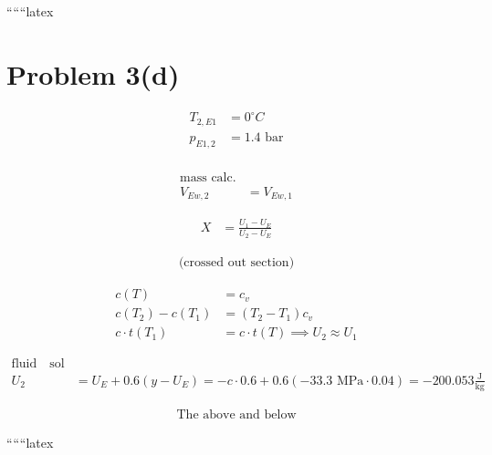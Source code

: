 ``````latex


\section*{Problem 3(d)}

\begin{align*}
T_{2, E1} &= 0^\circ C \\
p_{E1, 2} &= 1.4 \text{ bar} \\
\end{align*}

\begin{align*}
\text{mass calc.} \\
V_{Ew, 2} &= V_{Ew, 1}
\end{align*}

\begin{align*}
X &= \frac{U_1 - U_E}{U_2 - U_E}
\end{align*}

\begin{align*}
\text{(crossed out section)}
\end{align*}

\begin{align*}
c(T) &= c_v \\
c(T_2) - c(T_1) &= (T_2 - T_1) c_v \\
c \cdot t(T_1) &= c \cdot t(T) \implies U_2 \approx U_1
\end{align*}

\begin{align*}
\text{fluid} \quad \text{sol} \\
U_2 &= U_E + 0.6 \left( y - U_E \right) = -c \cdot 0.6 + 0.6 \left( -33.3 \text{ MPa} \cdot 0.04 \right) = -200.053 \frac{\text{J}}{\text{kg}}
\end{align*}

\begin{align*}
\text{The above and below}
\end{align*}

``````latex


